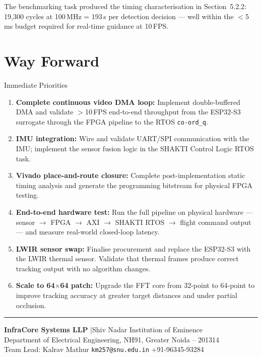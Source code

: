 \documentclass[12pt,a4paper]{article}
\begin{document}
The benchmarking task produced the timing characterisation in Section~5.2.2: 19,300 cycles at 100\,MHz = 193\,\textmu{}s per detection decision --- well within the $<$5\,ms budget required for real-time guidance at 10\,FPS.

\section{Way Forward}

\begin{reportbox}{Immediate Priorities}
\begin{enumerate}[leftmargin=*, itemsep=8pt]

\item \textbf{Complete continuous video DMA loop:} Implement double-buffered DMA and validate $>$10\,FPS end-to-end throughput from the ESP32-S3 surrogate through the FPGA pipeline to the RTOS \texttt{co-ord\_q}.

\item \textbf{IMU integration:} Wire and validate UART/SPI communication with the IMU; implement the sensor fusion logic in the SHAKTI Control Logic RTOS task.

\item \textbf{Vivado place-and-route closure:} Complete post-implementation static timing analysis and generate the programming bitstream for physical FPGA testing.

\item \textbf{End-to-end hardware test:} Run the full pipeline on physical hardware --- sensor $\to$ FPGA $\to$ AXI $\to$ SHAKTI RTOS $\to$ flight command output --- and measure real-world closed-loop latency.

\item \textbf{LWIR sensor swap:} Finalise procurement and replace the ESP32-S3 with the LWIR thermal sensor. Validate that thermal frames produce correct tracking output with no algorithm changes.

\item \textbf{Scale to 64$\times$64 patch:} Upgrade the FFT core from 32-point to 64-point to improve tracking accuracy at greater target distances and under partial occlusion.

\end{enumerate}
\end{reportbox}

\vspace{2em}

\begin{center}
{\color{Navy}\rule{0.6\linewidth}{1pt}}

\vspace{0.8em}
{\small\color{DarkText}
\textbf{InfraCore Systems LLP} \quad|\quad Shiv Nadar Institution of Eminence\\
Department of Electrical Engineering, NH91, Greater Noida -- 201314\\[4pt]
Team Lead: Kalrav Mathur \quad \texttt{km257@snu.edu.in} \quad +91-96345-93284
}
\end{center}
\end{document}
